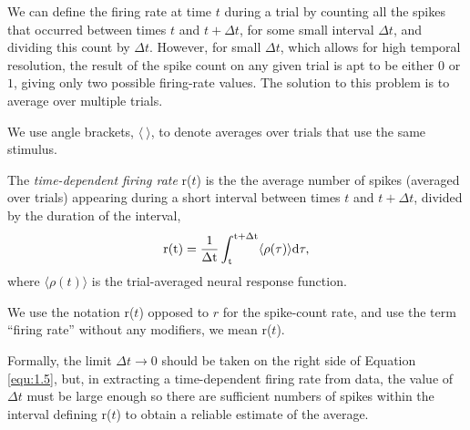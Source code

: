 \begin{exm}
  \label{exm:singleTrial}
  We can define the firing rate at time $t$ during a trial by counting all the spikes that occurred between times $t$ and $t + \Delta t$, for some small interval $\Delta t$, and dividing this count by $\Delta t$. However, for small $\Delta t$, which allows for high temporal resolution, the
result of the spike count on any given trial is apt to be either $0$ or $1$, giving
only two possible firing-rate values. The solution to this problem is to average over multiple trials.
\end{exm}

\begin{ntn}
  We use angle brackets, $\langle\ \rangle $, to denote averages over trials that use the same stimulus.
\end{ntn}


\begin{defn}
  The \emph{time-dependent firing rate} r($t$) is the the average number of spikes (averaged over trials) appearing 
  during a
  short interval between times $t$ and $t+\Delta t$, divided by the duration of
   the interval,
   \begin{equation}
    \label{equ:1.5}
     \rm{r}(t)=\frac{1}{\Delta t}\int_t^{t+\Delta t}\langle \rho(\tau)\rangle d\tau,
   \end{equation}
   where $\langle\rho(t)\rangle$ is the trial-averaged neural response function.
\end{defn}      

\begin{ntn}
  We use the notation r($t$) opposed to $r$ for the spike-count rate, and use the term 
  “firing rate” without any
modifiers, we mean r($t$).
\end{ntn}

\begin{rem}
  Formally, the limit $\Delta t\rightarrow 0$ should be taken on
the right side of Equation \ref{equ:1.5}, but, in extracting a time-dependent firing
rate from data, the value of $\Delta t$ must be large enough so there are sufficient
numbers of spikes within the interval defining r($t$) to obtain a reliable estimate of the 
average.
\end{rem}

